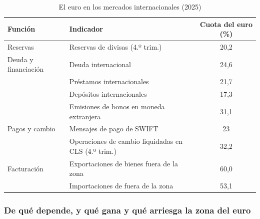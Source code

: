 \documentclass[11pt]{article}
\begin{document}
\begin{table}[H]
\centering
\caption{El euro en los mercados internacionales (2025)}\label{tab:euro-internacional}
\small
\begin{tabular}{llc}
\hline
\rowcolor{tceeazulpalido}\textbf{Función} & \textbf{Indicador} & \textbf{Cuota del euro (\%)}\\
\hline
Reservas & Reservas de divisas (4.º trim.) & 20,2\\
Deuda y financiación & Deuda internacional & 24,6\\
 & Préstamos internacionales & 21,7\\
 & Depósitos internacionales & 17,3\\
 & Emisiones de bonos en moneda extranjera & 31,1\\
Pagos y cambio & Mensajes de pago de SWIFT & 23\\
 & Operaciones de cambio liquidadas en CLS (4.º trim.) & 32,2\\
Facturación & Exportaciones de bienes fuera de la zona & 60,0\\
 & Importaciones de fuera de la zona & 53,1\\
\hline
\end{tabular}
\end{table}

\subsubsection{De qué depende, y qué gana y qué arriesga la zona del euro}\label{sec:internacional-determinantes}
\end{document}
